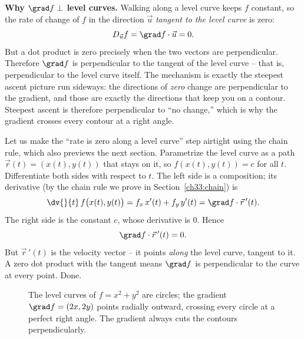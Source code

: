 \begin{whybox}
\textbf{Why $\grad f \perp$ level curves.} Walking along a level curve keeps $f$
constant, so the rate of change of $f$ in the direction $\vec u$ \emph{tangent to
the level curve} is zero:
\[
  D_{\vec u} f = \grad f \cdot \vec u = 0.
\]
But a dot product is zero precisely when the two vectors are perpendicular.
Therefore $\grad f$ is perpendicular to the tangent of the level curve -- that is,
perpendicular to the level curve itself. The mechanism is exactly the steepest
ascent picture run sideways: the directions of \emph{zero} change are
perpendicular to the gradient, and those are exactly the directions that keep you
on a contour. Steepest ascent is therefore perpendicular to ``no change,'' which
is why the gradient crosses every contour at a right angle.
\end{whybox}

Let us make the ``rate is zero along a level curve'' step airtight using the chain
rule, which also previews the next section. Parametrize the level curve as a path
$\vec r(t)=(x(t),y(t))$ that stays on it, so $f(x(t),y(t))=c$ for all $t$.
Differentiate both sides with respect to $t$. The left side is a composition;
its derivative (by the chain rule we prove in Section~\ref{ch33:chain}) is
\[
  \dv{}{t}\,f\big(x(t),y(t)\big) = f_x\,x'(t) + f_y\,y'(t)
  = \grad f \cdot \vec r\,'(t).
\]
The right side is the constant $c$, whose derivative is $0$. Hence
\[
  \grad f \cdot \vec r\,'(t) = 0.
\]
But $\vec r\,'(t)$ is the velocity vector -- it points \emph{along} the level
curve, tangent to it. A zero dot product with the tangent means $\grad f$ is
perpendicular to the curve at every point. Done.

\begin{figure}[H]
\centering
{}
\caption{The level curves of $f=x^2+y^2$ are circles; the gradient $\grad
f=(2x,2y)$ points radially outward, crossing every circle at a perfect right
angle. The gradient always cuts the contours perpendicularly.}
\label{ch33:fig-contours}
\end{figure}

